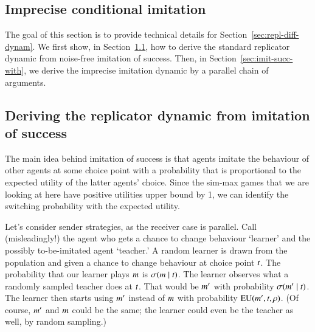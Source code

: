 \documentclass[12pt,english]{article}
\numberwithin{equation}{section}
\begin{document}
\begin{appendices}

\section{Imprecise conditional imitation}
\label{sec:formal-stuff}

The goal of this section is to provide technical details for
Section~\ref{sec:repl-diff-dynam}. We first show, in Section~\ref{sec:cond-imit-succ}, how to
derive the standard replicator dynamic from noise-free imitation of success. Then, in
Section~\ref{sec:imit-succ-with}, we derive the imprecise imitation dynamic by a parallel
chain of arguments.


\subsection{Deriving the replicator dynamic from imitation of success}
\label{sec:cond-imit-succ}

The main idea behind imitation of success is that agents imitate the behaviour of other
agents at some choice point with a probability that is proportional to the expected utility of
the latter agents' choice. Since the sim-max games that we are looking at here have positive
utilities upper bound by 1, we can identify the switching probability with the expected
utility.

Let's consider sender strategies, as the receiver case is parallel. Call (misleadingly!) the
agent who gets a chance to change behaviour `learner' and the possibly to-be-imitated agent
`teacher.' A random learner is drawn from the population and given a chance to change
behaviour at choice point $t$. The probability that our learner plays $m$ is
$\sigma(m \mid t)$. The learner observes what a randomly sampled teacher does at
$t$. That would be $m'$ with probability $\sigma(m' \mid t)$. The
learner then starts using $m'$ instead of $m$ with probability
$\mathrm{EU}(m', t, \rho)$. (Of course, $m'$ and $m$ could be the same; the
learner could even be the teacher as well, by random sampling.)


\end{appendices}
\end{document}
